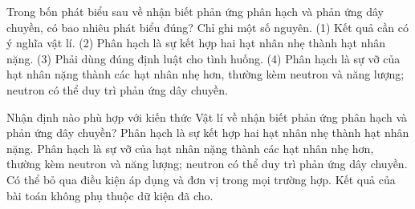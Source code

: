 \begin{ex}
Trong bốn phát biểu sau về nhận biết phản ứng phân hạch và phản ứng dây chuyền, có bao nhiêu phát biểu đúng? Chỉ ghi một số nguyên. (1) Kết quả cần có ý nghĩa vật lí. (2) Phân hạch là sự kết hợp hai hạt nhân nhẹ thành hạt nhân nặng. (3) Phải dùng đúng định luật cho tình huống. (4) Phân hạch là sự vỡ của hạt nhân nặng thành các hạt nhân nhẹ hơn, thường kèm neutron và năng lượng; neutron có thể duy trì phản ứng dây chuyền.
\end{ex}

\begin{ex}
Nhận định nào phù hợp với kiến thức Vật lí về nhận biết phản ứng phân hạch và phản ứng dây chuyền?
\choice
{Phân hạch là sự kết hợp hai hạt nhân nhẹ thành hạt nhân nặng.}
{\True Phân hạch là sự vỡ của hạt nhân nặng thành các hạt nhân nhẹ hơn, thường kèm neutron và năng lượng; neutron có thể duy trì phản ứng dây chuyền.}
{Có thể bỏ qua điều kiện áp dụng và đơn vị trong mọi trường hợp.}
{Kết quả của bài toán không phụ thuộc dữ kiện đã cho.}
\end{ex}

